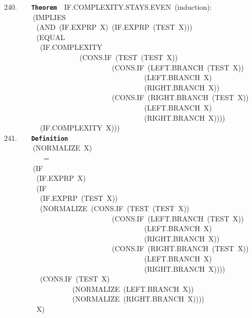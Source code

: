 \documentclass[11pt]{book}
\newenvironment{pubasis}{\begin{flushleft}\ttfamily\small}{\normalsize\rmfamily\end{flushleft}}
\newcommand{\axiomordefinition}[1]{\vspace{6pt}\texttt{\textbf{#1}}}
\begin{document}
\begin{pubasis}
240.~~~~\axiomordefinition{Theorem}~~IF.COM\-PLEX\-I\-TY.STAYS.EVEN~(induction):\\
~~~~~~~~(IMPLIES\\
~~~~~~~~~(AND~(IF.EXPRP~X)~(IF.EXPRP~(TEST~X)))\\
~~~~~~~~~(EQUAL\\
~~~~~~~~~~(IF.COM\-PLEX\-I\-TY\\
~~~~~~~~~~~~~~~~~~~~~(CONS.IF~(TEST~(TEST~X))\\
~~~~~~~~~~~~~~~~~~~~~~~~~~~~~~(CONS.IF~(LEFT.BRANCH~(TEST~X))\\
~~~~~~~~~~~~~~~~~~~~~~~~~~~~~~~~~~~~~~~(LEFT.BRANCH~X)\\
~~~~~~~~~~~~~~~~~~~~~~~~~~~~~~~~~~~~~~~(RIGHT.BRANCH~X))\\
~~~~~~~~~~~~~~~~~~~~~~~~~~~~~~(CONS.IF~(RIGHT.BRANCH~(TEST~X))\\
~~~~~~~~~~~~~~~~~~~~~~~~~~~~~~~~~~~~~~~(LEFT.BRANCH~X)\\
~~~~~~~~~~~~~~~~~~~~~~~~~~~~~~~~~~~~~~~(RIGHT.BRANCH~X))))\\
~~~~~~~~~~(IF.COM\-PLEX\-I\-TY~X)))\\

241.~~~~\axiomordefinition{Definition}\\
~~~~~~~~(NORMALIZE~X)\\
~~~~~~~~~~~=\\
~~~~~~~~(IF\\
~~~~~~~~~(IF.EXPRP~X)\\
~~~~~~~~~(IF\\
~~~~~~~~~~(IF.EXPRP~(TEST~X))\\
~~~~~~~~~~(NOR\-MAL\-IZE~(CONS.IF~(TEST~(TEST~X))\\
~~~~~~~~~~~~~~~~~~~~~~~~~~~~~~(CONS.IF~(LEFT.BRANCH~(TEST~X))\\
~~~~~~~~~~~~~~~~~~~~~~~~~~~~~~~~~~~~~~~(LEFT.BRANCH~X)\\
~~~~~~~~~~~~~~~~~~~~~~~~~~~~~~~~~~~~~~~(RIGHT.BRANCH~X))\\
~~~~~~~~~~~~~~~~~~~~~~~~~~~~~~(CONS.IF~(RIGHT.BRANCH~(TEST~X))\\
~~~~~~~~~~~~~~~~~~~~~~~~~~~~~~~~~~~~~~~(LEFT.BRANCH~X)\\
~~~~~~~~~~~~~~~~~~~~~~~~~~~~~~~~~~~~~~~(RIGHT.BRANCH~X))))\\
~~~~~~~~~~(CONS.IF~(TEST~X)\\
~~~~~~~~~~~~~~~~~~~(NOR\-MAL\-IZE~(LEFT.BRANCH~X))\\
~~~~~~~~~~~~~~~~~~~(NOR\-MAL\-IZE~(RIGHT.BRANCH~X))))\\
~~~~~~~~~X)\\


\end{pubasis}
\end{document}
